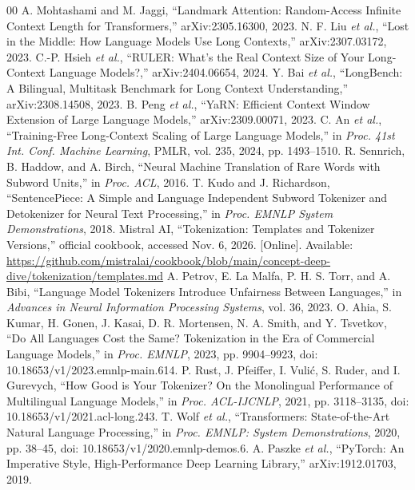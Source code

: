 \documentclass[conference]{IEEEtran}
\begin{document}
\begin{thebibliography}{00}
 A. Mohtashami and M. Jaggi, ``Landmark Attention: Random-Access Infinite Context Length for Transformers,'' arXiv:2305.16300, 2023.
 N. F. Liu \emph{et al.}, ``Lost in the Middle: How Language Models Use Long Contexts,'' arXiv:2307.03172, 2023.
 C.-P. Hsieh \emph{et al.}, ``RULER: What's the Real Context Size of Your Long-Context Language Models?,'' arXiv:2404.06654, 2024.
 Y. Bai \emph{et al.}, ``LongBench: A Bilingual, Multitask Benchmark for Long Context Understanding,'' arXiv:2308.14508, 2023.
 B. Peng \emph{et al.}, ``YaRN: Efficient Context Window Extension of Large Language Models,'' arXiv:2309.00071, 2023.
 C. An \emph{et al.}, ``Training-Free Long-Context Scaling of Large Language Models,'' in \emph{Proc. 41st Int. Conf. Machine Learning}, PMLR, vol. 235, 2024, pp. 1493--1510.
 R. Sennrich, B. Haddow, and A. Birch, ``Neural Machine Translation of Rare Words with Subword Units,'' in \emph{Proc. ACL}, 2016.
 T. Kudo and J. Richardson, ``SentencePiece: A Simple and Language Independent Subword Tokenizer and Detokenizer for Neural Text Processing,'' in \emph{Proc. EMNLP System Demonstrations}, 2018.
 Mistral AI, ``Tokenization: Templates and Tokenizer Versions,'' official cookbook, accessed Nov. 6, 2026. [Online]. Available: \url{https://github.com/mistralai/cookbook/blob/main/concept-deep-dive/tokenization/templates.md}
 A. Petrov, E. La Malfa, P. H. S. Torr, and A. Bibi, ``Language Model Tokenizers Introduce Unfairness Between Languages,'' in \emph{Advances in Neural Information Processing Systems}, vol. 36, 2023.
 O. Ahia, S. Kumar, H. Gonen, J. Kasai, D. R. Mortensen, N. A. Smith, and Y. Tsvetkov, ``Do All Languages Cost the Same? Tokenization in the Era of Commercial Language Models,'' in \emph{Proc. EMNLP}, 2023, pp. 9904--9923, doi: 10.18653/v1/2023.emnlp-main.614.
 P. Rust, J. Pfeiffer, I. Vuli\'c, S. Ruder, and I. Gurevych, ``How Good is Your Tokenizer? On the Monolingual Performance of Multilingual Language Models,'' in \emph{Proc. ACL-IJCNLP}, 2021, pp. 3118--3135, doi: 10.18653/v1/2021.acl-long.243.
 T. Wolf \emph{et al.}, ``Transformers: State-of-the-Art Natural Language Processing,'' in \emph{Proc. EMNLP: System Demonstrations}, 2020, pp. 38--45, doi: 10.18653/v1/2020.emnlp-demos.6.
 A. Paszke \emph{et al.}, ``PyTorch: An Imperative Style, High-Performance Deep Learning Library,'' arXiv:1912.01703, 2019.

\end{thebibliography}
\end{document}
